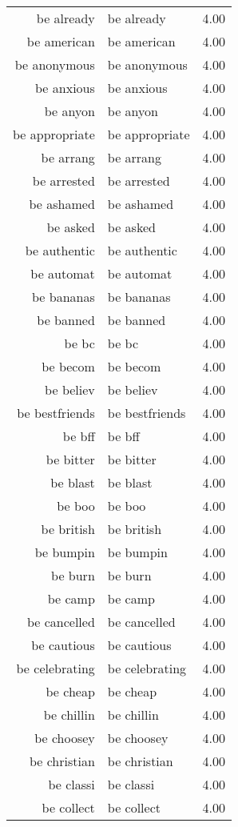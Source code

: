 \begin{table}[ht]
\begin{tabular}{rlr}
  be already & be already & 4.00 \\ 
  be american & be american & 4.00 \\ 
  be anonymous & be anonymous & 4.00 \\ 
  be anxious & be anxious & 4.00 \\ 
  be anyon & be anyon & 4.00 \\ 
  be appropriate & be appropriate & 4.00 \\ 
  be arrang & be arrang & 4.00 \\ 
  be arrested & be arrested & 4.00 \\ 
  be ashamed & be ashamed & 4.00 \\ 
  be asked & be asked & 4.00 \\ 
  be authentic & be authentic & 4.00 \\ 
  be automat & be automat & 4.00 \\ 
  be bananas & be bananas & 4.00 \\ 
  be banned & be banned & 4.00 \\ 
  be bc & be bc & 4.00 \\ 
  be becom & be becom & 4.00 \\ 
  be believ & be believ & 4.00 \\ 
  be bestfriends & be bestfriends & 4.00 \\ 
  be bff & be bff & 4.00 \\ 
  be bitter & be bitter & 4.00 \\ 
  be blast & be blast & 4.00 \\ 
  be boo & be boo & 4.00 \\ 
  be british & be british & 4.00 \\ 
  be bumpin & be bumpin & 4.00 \\ 
  be burn & be burn & 4.00 \\ 
  be camp & be camp & 4.00 \\ 
  be cancelled & be cancelled & 4.00 \\ 
  be cautious & be cautious & 4.00 \\ 
  be celebrating & be celebrating & 4.00 \\ 
  be cheap & be cheap & 4.00 \\ 
  be chillin & be chillin & 4.00 \\ 
  be choosey & be choosey & 4.00 \\ 
  be christian & be christian & 4.00 \\ 
  be classi & be classi & 4.00 \\ 
  be collect & be collect & 4.00 \\ 

\end{tabular}
\end{table}
